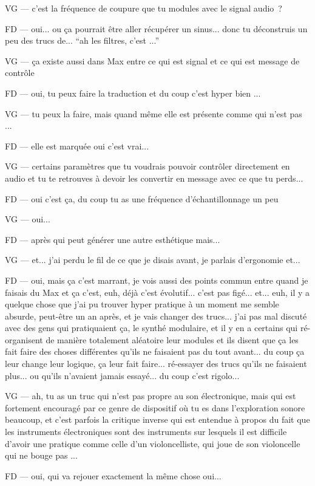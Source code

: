 VG — c'est la fréquence de coupure que tu modules avec le signal audio ? 

FD — oui... ou ça pourrait être aller récupérer un sinus... donc tu déconstruis un peu des trucs de... ``ah les filtres, c'est ...''   

VG — ça existe aussi dans Max entre ce qui est signal et ce qui est message de contrôle 

FD — oui, tu peux faire la traduction et du coup c'est hyper bien ... 

VG — tu peux la faire, mais quand même elle est présente comme qui n'est pas ... 

FD — elle est marquée oui c'est vrai... 

VG — certains paramètres que tu voudrais pouvoir contrôler directement en audio et tu te retrouves à devoir les convertir en message avec ce que tu perds... 

FD — oui c'est ça, du coup tu as une fréquence d'échantillonnage un peu 

VG — oui... 

FD — après qui peut générer une autre esthétique mais... 

VG — et... j'ai perdu le fil de ce que je disais avant, je parlais d'ergonomie et... 

FD — oui, mais ça c'est marrant, je vois aussi des points commun entre quand je faisais du Max et ça c'est, euh, déjà c'est évolutif... c'est pas figé... et... euh, il y a quelque chose que j'ai pu trouver hyper pratique à un moment me semble absurde, peut-être un an après, et je vais changer des trucs... j'ai pas mal discuté avec des gens qui pratiquaient ça, le synthé modulaire, et il y en a certains qui ré-organisent de manière totalement aléatoire leur modules et ils disent que ça les fait  faire des choses différentes qu'ils ne faisaient pas du tout avant... du coup ça leur change leur logique, ça leur fait faire... ré-essayer des trucs qu'ils ne faisaient plus... ou qu'ils n'avaient jamais essayé... du coup c'est rigolo... 

VG — ah, tu as un truc qui n'est pas propre au son électronique, mais qui est fortement encouragé par ce genre de dispositif où tu es dans l'exploration sonore beaucoup, et c'est parfois la critique inverse qui est entendue à propos du fait que les instruments électroniques sont des instruments sur lesquels il est difficile d'avoir une pratique comme celle d'un violoncelliste, qui joue de son violoncelle qui ne bouge pas ... 

FD — oui, qui va rejouer exactement la même chose oui... 

